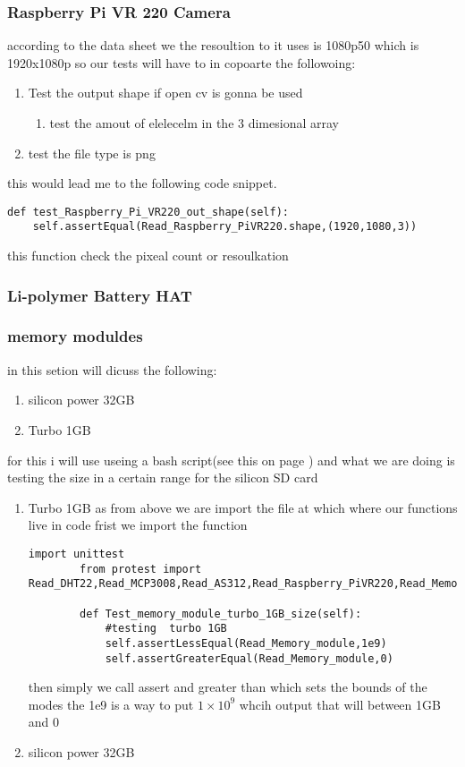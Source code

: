 \subsubsection{Raspberry Pi VR 220 Camera}
according to the  data sheet \cite{Camera}
we the  resoultion to  it uses is  1080p50 which is 1920x1080p so our  tests will have to  in copoarte  the  followoing:
\begin{enumerate}
    \item Test the  output shape  if open cv is  gonna  be  used 
    \begin{enumerate}
        \item test  the  amout of   elelecelm in the  3 dimesional   array 
    \end{enumerate}
    \item test the  file  type  is png
\end{enumerate}
this would lead me to the following code snippet.
\begin{lstlisting}[style=mystyle,caption={camera unit test}]
    def test_Raspberry_Pi_VR220_out_shape(self):
    self.assertEqual(Read_Raspberry_PiVR220.shape,(1920,1080,3))
\end{lstlisting}
this function check the  pixeal count or resoulkation
\subsubsection{Li-polymer Battery HAT}

\subsubsection{memory moduldes }
in this setion will dicuss the following:
\begin{enumerate}
    \item silicon power 32GB 
    \item Turbo 1GB
\end{enumerate}
for this  i will use  useing  a  bash script(see this on page \pageref{TDD sample bash}) and what we are doing is  testing  the size in a  certain range for the silicon  SD card
\begin{enumerate}
    \item  Turbo 1GB
    as from above we are  import the file at which where our functions live in code frist we import the function
    \begin{lstlisting}[style=mystyle,caption={si powerd SD snippnet }]
        import unittest
        from protest import Read_DHT22,Read_MCP3008,Read_AS312,Read_Raspberry_PiVR220,Read_Memory_module
    
        def Test_memory_module_turbo_1GB_size(self):
            #testing  turbo 1GB
            self.assertLessEqual(Read_Memory_module,1e9)
            self.assertGreaterEqual(Read_Memory_module,0)
    \end{lstlisting}
    then simply we call assert and greater than which sets the bounds of the   modes the 1e9 is a way to put $1 × 10^9$
    whcih output that will between 1GB and  0
    \item silicon power 32GB
\end{enumerate} 
